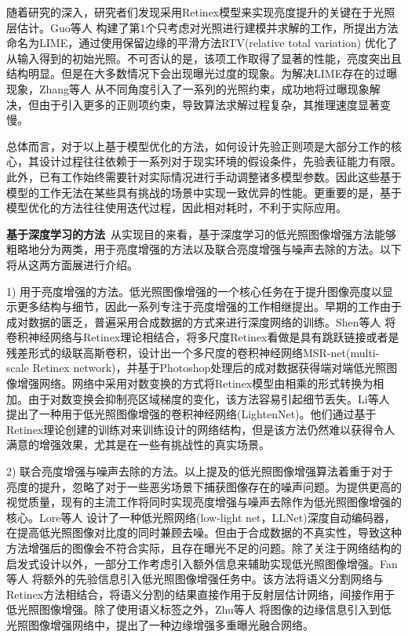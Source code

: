 随着研究的深入，研究者们发现采用Retinex模型来实现亮度提升的关键在于光照层估计。Guo等人 \cite{DBLP:journals/tip/GuoLL17} 构建了第1个只考虑对光照进行建模并求解的工作，所提出方法命名为LIME，通过使用保留边缘的平滑方法RTV(relative total variation) \cite{DBLP:journals/tog/XuYXJ12} 优化了从输入得到的初始光照。不可否认的是，该项工作取得了显著的性能，亮度突出且结构明显。但是在大多数情况下会出现曝光过度的现象。为解决LIME存在的过曝现象，Zhang等人 \cite{DBLP:conf/mm/ZhangYXZZ18, DBLP:journals/tmm/ZhangNZXZ21}从不同角度引入了一系列的光照约束，成功地将过曝现象解决，但由于引入更多的正则项约束，导致算法求解过程复杂，其推理速度显著变慢。

总体而言，对于以上基于模型优化的方法，如何设计先验正则项是大部分工作的核心，其设计过程往往依赖于一系列对于现实环境的假设条件，先验表征能力有限。此外，已有工作始终需要针对实际情况进行手动调整诸多模型参数。因此这些基于模型的工作无法在某些具有挑战的场景中实现一致优异的性能。更重要的是，基于模型优化的方法往往使用迭代过程，因此相对耗时，不利于实际应用。


\noindent\textbf{基于深度学习的方法}~从实现目的来看，基于深度学习的低光照图像增强方法能够粗略地分为两类，用于亮度增强的方法以及联合亮度增强与噪声去除的方法。以下将从这两方面展进行介绍。

1) 用于亮度增强的方法。低光照图像增强的一个核心任务在于提升图像亮度以显示更多结构与细节，因此一系列专注于亮度增强的工作相继提出。早期的工作由于成对数据的匮乏，普遍采用合成数据的方式来进行深度网络的训练。Shen等人 \cite{DBLP:journals/corr/abs-1711-02488}将卷积神经网络与Retinex理论相结合，将多尺度Retinex看做是具有跳跃链接或者是残差形式的级联高斯卷积，设计出一个多尺度的卷积神经网络MSR-net(multi-scale Retinex network)，并基于Photoshop处理后的成对数据获得端对端低光照图像增强网络。网络中采用对数变换的方式将Retinex模型由相乘的形式转换为相加。由于对数变换会抑制亮区域梯度的变化，该方法容易引起细节丢失。Li等人 \cite{DBLP:journals/prl/LiGPP18}提出了一种用于低光照图像增强的卷积神经网络(LightenNet)。他们通过基于Retinex理论创建的训练对来训练设计的网络结构，但是该方法仍然难以获得令人满意的增强效果，尤其是在一些有挑战性的真实场景。

2) 联合亮度增强与噪声去除的方法。以上提及的低光照图像增强算法着重于对于亮度的提升，忽略了对于一些恶劣场景下捕获图像存在的噪声问题。为提供更高的视觉质量，现有的主流工作将同时实现亮度增强与噪声去除作为低光照图像增强的核心。Lore等人 \cite{DBLP:journals/pr/LoreAS17}设计了一种低光照网络(low-light net，LLNet)深度自动编码器，在提高低光照图像对比度的同时兼顾去噪。但由于合成数据的不真实性，导致这种方法增强后的图像会不符合实际，且存在曝光不足的问题。除了关注于网络结构的启发式设计以外，一部分工作考虑引入额外信息来辅助实现低光照图像增强。Fan等人 \cite{DBLP:conf/mm/FanWY020}将额外的先验信息引入低光照图像增强任务中。该方法将语义分割网络与Retinex方法相结合，将语义分割的结果直接作用于反射层估计网络，间接作用于低光照图像增强。除了使用语义标签之外，Zhu等人 \cite{DBLP:conf/aaai/ZhuPCY20}将图像的边缘信息引入到低光照图像增强网络中，提出了一种边缘增强多重曝光融合网络。

